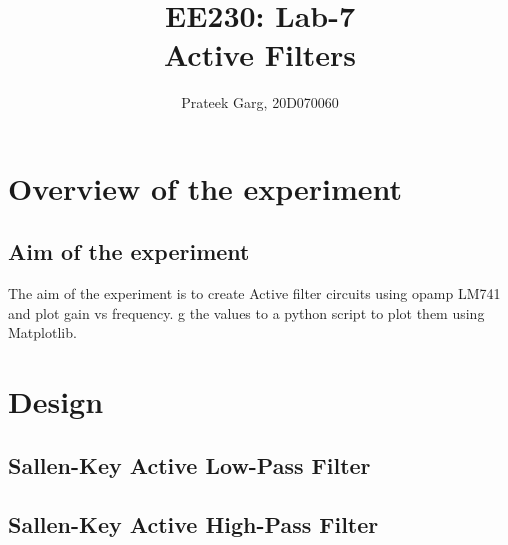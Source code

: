 \documentclass[12pt]{article}
\title{EE230: Lab-7\\
Active Filters}
\author{Prateek Garg, 20D070060}
\begin{document}
\noindent
\maketitle

\section{Overview of the experiment} %

\subsection{Aim of the experiment}%
The aim of the experiment is to create Active filter circuits using opamp LM741 and plot gain vs frequency.
g the values to a python script to plot them using Matplotlib.

\section{Design}
\subsection{Sallen-Key Active Low-Pass Filter}
\subsection{Sallen-Key Active High-Pass Filter}
\end{document}
